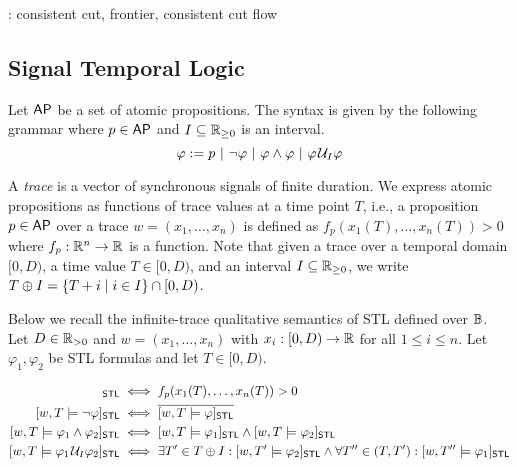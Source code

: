 \begin{example}
	\TODO: consistent cut, frontier, consistent cut flow
\end{example}


\subsection{Signal Temporal Logic} \label{sec:stl}
Let $\mathsf{AP}$ be a set of atomic propositions.
The syntax is given by the following grammar where $p \in \mathsf{AP}$ and $I \subseteq \mathbb{R}_{\geq 0}$ is an interval.
$$ \varphi :=  p ~|~ \lnot \varphi ~|~ \varphi \land \varphi ~|~ \varphi \kern.1em\mathcal{U}_I \varphi$$

A \emph{trace} is a vector of synchronous signals of finite duration.
We express atomic propositions as functions of trace values at a time point $T$, i.e., a proposition $p \in \mathsf{AP}$ over a trace $w = (x_1, \ldots, x_n)$ is defined as $f_p(x_1(T), \ldots, x_n(T)) > 0$ where $f_p : \mathbb{R}^n \to \mathbb{R}$ is a function.
Note that given a trace over a temporal domain $[0,D)$, a time value $T \in [0,D)$, and an interval $I \subseteq \mathbb{R}_{\geq 0}$, we write $T \oplus I = \{T + i \st i \in I\} \cap [0,D)$.

Below we recall the infinite-trace qualitative semantics of STL defined over $\mathbb{B}$.
Let $D \in \mathbb{R}_{> 0}$ and $w = (x_1, \ldots, x_n)$ with $x_i : [0,D) \to \mathbb{R}$ for all $1 \leq i \leq n$.
Let $\varphi_1, \varphi_2$ be STL formulas and let $T \in [0,D)$.

\small
\begin{align*}
	[w,T \models p]_{\mathsf{STL}} &\iff f_p(x_1(T), \ldots, x_n(T)) > 0 \\
	[w,T \models \lnot \varphi]_{\mathsf{STL}} &\iff \overline{[w,T \models \varphi]_{\mathsf{STL}}} \\
	[w,T \models \varphi_1 \land \varphi_2]_{\mathsf{STL}} &\iff [w,T \models \varphi_1]_{\mathsf{STL}} \land [w,T \models \varphi_2]_{\mathsf{STL}} \\
	[w,T \models \varphi_1 \until_I \varphi_2]_{\mathsf{STL}} &\iff \exists T' \in T \oplus I : [w,T' \models \varphi_2]_{\mathsf{STL}} \land \forall T'' \in (T, T') : [w,T'' \models \varphi_1]_{\mathsf{STL}} \\
\end{align*}
\normalsize

